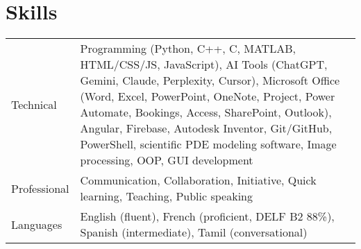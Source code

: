 \documentclass[a4paper,10pt]{article}
\begin{document}
\section{Skills}
\begin{tabularx}{\linewidth}{@{}l X@{}}
Technical &  \normalsize{Programming (Python, C++, C, MATLAB, HTML/CSS/JS, JavaScript), AI Tools (ChatGPT, Gemini, Claude, Perplexity, Cursor), Microsoft Office (Word, Excel, PowerPoint, OneNote, Project, Power Automate, Bookings, Access, SharePoint, Outlook), Angular, Firebase, Autodesk Inventor, Git/GitHub, PowerShell, scientific PDE modeling software, Image processing, OOP, GUI development}\\
Professional  &  \normalsize{Communication, Collaboration, Initiative, Quick learning, Teaching, Public speaking}\\  
Languages & \normalsize{English (fluent), French (proficient, DELF B2 88\%), Spanish (intermediate), Tamil (conversational)}\\
\end{tabularx}

\end{document}
